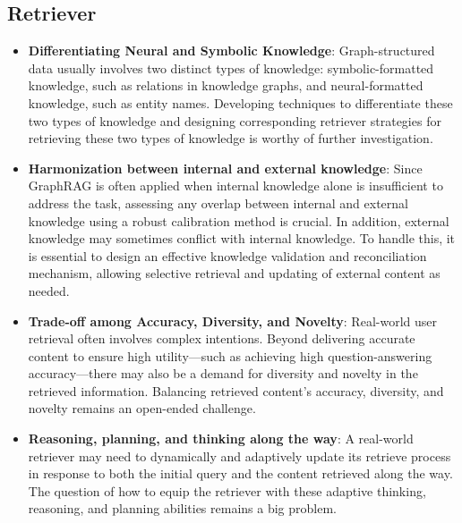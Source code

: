 \subsection{Retriever}
\begin{itemize}[leftmargin=*]
    \item \textbf{Differentiating Neural and Symbolic Knowledge}: Graph-structured data usually involves two distinct types of knowledge: symbolic-formatted knowledge, such as relations in knowledge graphs, and neural-formatted knowledge, such as entity names. Developing techniques to differentiate these two types of knowledge and designing corresponding retriever strategies for retrieving these two types of knowledge is worthy of further investigation.

    \item \textbf{Harmonization between internal and external knowledge}: Since GraphRAG is often applied when internal knowledge alone is insufficient to address the task, assessing any overlap between internal and external knowledge using a robust calibration method is crucial. In addition, external knowledge may sometimes conflict with internal knowledge. To handle this, it is essential to design an effective knowledge validation and reconciliation mechanism, allowing selective retrieval and updating of external content as needed.


    \item \textbf{Trade-off among Accuracy, Diversity, and Novelty}: Real-world user retrieval often involves complex intentions. Beyond delivering accurate content to ensure high utility—such as achieving high question-answering accuracy—there may also be a demand for diversity and novelty in the retrieved information. Balancing retrieved content's accuracy, diversity, and novelty remains an open-ended challenge.

    \item \textbf{Reasoning, planning, and thinking along the way}: A real-world retriever may need to dynamically and adaptively update its retrieve process in response to both the initial query and the content retrieved along the way. The question of how to equip the retriever with these adaptive thinking, reasoning, and planning abilities remains a big problem.

\end{itemize}
    
